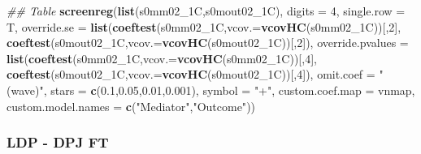 \documentclass[
]{article}
\newenvironment{Shaded}{\begin{snugshade}}{\end{snugshade}}
\newcommand{\CommentTok}[1]{\textcolor[rgb]{0.56,0.35,0.01}{\textit{#1}}}
\newcommand{\DataTypeTok}[1]{\textcolor[rgb]{0.13,0.29,0.53}{#1}}
\newcommand{\DecValTok}[1]{\textcolor[rgb]{0.00,0.00,0.81}{#1}}
\newcommand{\FloatTok}[1]{\textcolor[rgb]{0.00,0.00,0.81}{#1}}
\newcommand{\KeywordTok}[1]{\textcolor[rgb]{0.13,0.29,0.53}{\textbf{#1}}}
\newcommand{\NormalTok}[1]{#1}
\newcommand{\StringTok}[1]{\textcolor[rgb]{0.31,0.60,0.02}{#1}}
\begin{document}
\begin{Shaded}
\begin{Highlighting}[]
\CommentTok{## Table}
\KeywordTok{screenreg}\NormalTok{(}\KeywordTok{list}\NormalTok{(s0mm02_1C,s0mout02_1C), }\DataTypeTok{digits =} \DecValTok{4}\NormalTok{, }\DataTypeTok{single.row =}\NormalTok{ T,}
          \DataTypeTok{override.se =} \KeywordTok{list}\NormalTok{(}\KeywordTok{coeftest}\NormalTok{(s0mm02_1C,}\DataTypeTok{vcov.=}\KeywordTok{vcovHC}\NormalTok{(s0mm02_1C))[,}\DecValTok{2}\NormalTok{],}
                             \KeywordTok{coeftest}\NormalTok{(s0mout02_1C,}\DataTypeTok{vcov.=}\KeywordTok{vcovHC}\NormalTok{(s0mout02_1C))[,}\DecValTok{2}\NormalTok{]),}
          \DataTypeTok{override.pvalues =} \KeywordTok{list}\NormalTok{(}\KeywordTok{coeftest}\NormalTok{(s0mm02_1C,}\DataTypeTok{vcov.=}\KeywordTok{vcovHC}\NormalTok{(s0mm02_1C))[,}\DecValTok{4}\NormalTok{],}
                                  \KeywordTok{coeftest}\NormalTok{(s0mout02_1C,}\DataTypeTok{vcov.=}\KeywordTok{vcovHC}\NormalTok{(s0mout02_1C))[,}\DecValTok{4}\NormalTok{]),}
          \DataTypeTok{omit.coef =} \StringTok{"(wave)"}\NormalTok{, }\DataTypeTok{stars =} \KeywordTok{c}\NormalTok{(}\FloatTok{0.1}\NormalTok{,}\FloatTok{0.05}\NormalTok{,}\FloatTok{0.01}\NormalTok{,}\FloatTok{0.001}\NormalTok{), }\DataTypeTok{symbol =} \StringTok{"+"}\NormalTok{,}
          \DataTypeTok{custom.coef.map =}\NormalTok{ vnmap, }
          \DataTypeTok{custom.model.names =} \KeywordTok{c}\NormalTok{(}\StringTok{"Mediator"}\NormalTok{,}\StringTok{"Outcome"}\NormalTok{))}
\end{Highlighting}
\end{Shaded}

\hypertarget{ldp---dpj-ft}{%
\subsubsection{LDP - DPJ FT}\label{ldp---dpj-ft}}
\end{document}
